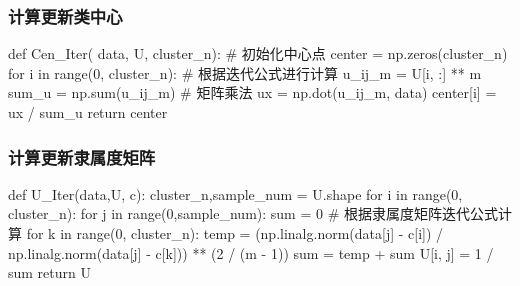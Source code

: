 \documentclass{article}
\begin{document}
\subsubsection{计算更新类中心}
\begin{python}
	def Cen_Iter( data, U, cluster_n):
		 # 初始化中心点
		 center = np.zeros(cluster_n)
		 for i in range(0, cluster_n):
		 	  # 根据迭代公式进行计算
			  u_ij_m = U[i, :] ** m
			  sum_u = np.sum(u_ij_m)
			  # 矩阵乘法
			  ux = np.dot(u_ij_m, data)
			  center[i] =  ux / sum_u
	 	 return center
\end{python}	
\subsubsection{计算更新隶属度矩阵}
\begin{python}
	def U_Iter(data,U, c):
		 cluster_n,sample_num = U.shape
		 for i in range(0, cluster_n):
		 	 for j in range(0,sample_num):
		 	 	 sum = 0
		 	 	 # 根据隶属度矩阵迭代公式计算
		 	 	 for k in range(0, cluster_n):
		 	 	 	 temp = (np.linalg.norm(data[j] - c[i]) /
		 	 	 	 np.linalg.norm(data[j] - c[k])) ** (2 / (m - 1))
		 	 	 	 sum = temp + sum
		 	 	 U[i, j] = 1 / sum
		 return U
\end{python}	
\end{document}
